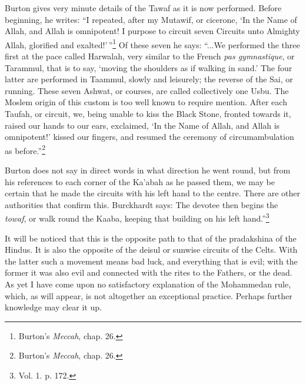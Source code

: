 \documentclass[a4paper, 11pt, oneside, polutonikogreek, english]{article}
\begin{document}
Burton gives very minute details of the Tawaf as it is now performed. Before beginning, he writes: ``I repeated, after my Mutawif, or cicerone, `In the Name of Allah, and Allah is omnipotent! I purpose to circuit seven Circuits unto Almighty Allah, glorified and exalted!'\,''\footnote{Burton's \emph{Meccah}, chap. 26.} Of these seven he says: ``...We performed the three first at the pace called Harwalah, very similar to the French \emph{pas gymnastique}, or Tarammul, that is to say, `moving the shoulders as if walking in sand.' The four latter are performed in Taammul, slowly and leisurely; the reverse of the Sai, or running. These seven Ashwat, or courses, are called collectively one Usbu. The Moslem origin of this custom is too well known to require mention. After each Taufah, or circuit, we, being unable to kiss the Black Stone, fronted towards it, raised our hands to our ears, exclaimed, `In the Name of Allah, and Allah is omnipotent!' kissed our fingers, and resumed the ceremony of circumambulation as before.''\footnote{Burton's \emph{Meccah}, chap. 26.}

Burton does not say in direct words in what direction he went round, but from his references to each corner of the Ka'abah as he passed them, we may be certain that he made the circuits with his left hand to the centre. There are other authorities that confirm this. Burckhardt says: The devotee then begins the \emph{towaf}, or walk round the Kaaba, keeping that building on his left hand.''\footnote{Vol. 1. p. 172.}

It will be noticed that this is the opposite path to that of the pradakshina of the Hindus. It is also the opposite of the deisul or sunwise circuits of the Celts. With the latter such a movement means bad luck, and everything that is evil; with the former it was also evil and connected with the rites to the Fathers, or the dead. As yet I have come upon no satisfactory explanation of the Mohammedan rule, which, as will appear, is not altogether an exceptional practice. Perhaps further knowledge may clear it up.
\end{document}
